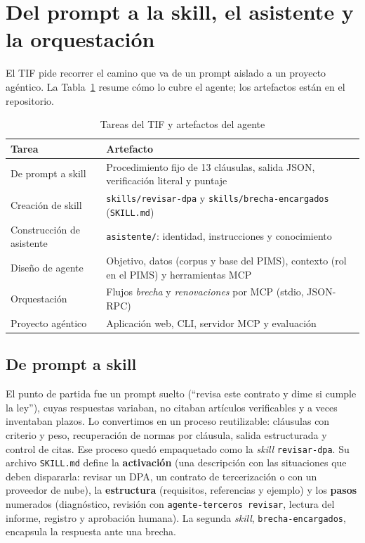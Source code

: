 \documentclass[conference]{IEEEtran}
\begin{document}
\section{Del prompt a la skill, el asistente y la orquestación}
El TIF pide recorrer el camino que va de un prompt aislado a un proyecto agéntico. La Tabla~\ref{tab:tif} resume cómo lo cubre el agente; los artefactos están en el repositorio.

\begin{table}[t]
\centering
\caption{Tareas del TIF y artefactos del agente}
\label{tab:tif}
\footnotesize
\begin{tabular}{@{}p{}p{}@{}}
\toprule
Tarea & Artefacto \\
\midrule
De prompt a skill & Procedimiento fijo de 13 cláusulas, salida JSON, verificación literal y puntaje \\
Creación de skill & \texttt{skills/revisar-dpa} y \texttt{skills/brecha-encargados} (\texttt{SKILL.md}) \\
Construcción de asistente & \texttt{asistente/}: identidad, instrucciones y conocimiento \\
Diseño de agente & Objetivo, datos (corpus y base del PIMS), contexto (rol en el PIMS) y herramientas MCP \\
Orquestación & Flujos \emph{brecha} y \emph{renovaciones} por MCP (stdio, JSON-RPC) \\
Proyecto agéntico & Aplicación web, CLI, servidor MCP y evaluación \\
\bottomrule
\end{tabular}
\end{table}

\subsection{De prompt a skill}
El punto de partida fue un prompt suelto (``revisa este contrato y dime si cumple la ley''), cuyas respuestas variaban, no citaban artículos verificables y a veces inventaban plazos. Lo convertimos en un proceso reutilizable: cláusulas con criterio y peso, recuperación de normas por cláusula, salida estructurada y control de citas. Ese proceso quedó empaquetado como la \emph{skill} \texttt{revisar-dpa}. Su archivo \texttt{SKILL.md} define la \textbf{activación} (una descripción con las situaciones que deben dispararla: revisar un DPA, un contrato de tercerización o con un proveedor de nube), la \textbf{estructura} (requisitos, referencias y ejemplo) y los \textbf{pasos} numerados (diagnóstico, revisión con \texttt{agente-terceros revisar}, lectura del informe, registro y aprobación humana). La segunda \emph{skill}, \texttt{brecha-encargados}, encapsula la respuesta ante una brecha.
\end{document}
